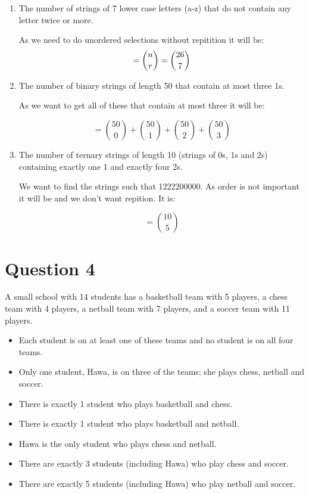 \documentclass[11pt]{article}
\begin{document}
\begin{enumerate}[label= (\alph*)]
  \item The number of strings of 7 lower case letters (a-z) that do not contain
    any letter twice or more.

    As we need to do unordered selections without repitition it will be:
  \[
    = \binom{n}{r} \\
    = \binom{26}{7}
  \]

  \item The number of binary strings of length 50 that contain at most three 1s.

    As we want to get all of these that contain at most three it will be:

    \[
      =\binom{50}{0} + \binom{50}{1} + \binom{50}{2} + \binom{50}{3}
    \]

  \item The number of ternary strings of length 10 (strings of 0s, 1s and 2s)
    containing exactly one 1 and exactly four 2s.

    We want to find the strings such that 1222200000. As order is not important
    it will be and we don't want repition. It is:

    \[
      =\binom{10}{5}
    \]

\end{enumerate}

\break{}
\section*{Question 4}

A small school with 14 students has a basketball team with 5 players, a chess
team with 4 players, a netball team with 7 players, and a soccer team with 11
players.

\begin{itemize}
  \item Each student is on at least one of these teams and no student is on all
    four teams.
  \item Only one student, Hawa, is on three of the teams; she plays chess,
    netball and soccer.
  \item There is exactly 1 student who plays basketball and chess.
  \item There is exactly 1 student who plays basketball and netball.
  \item Hawa is the only student who plays chess and netball.
  \item There are exactly 3 students (including Hawa) who play chess and soccer.
  \item There are exactly 5 students (including Hawa) who play netball and
    soccer.
\end{itemize}
\end{document}
